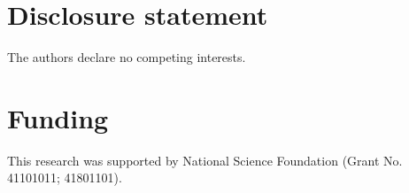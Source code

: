 \documentclass[]{interact}
\theoremstyle{plain}%
\theoremstyle{definition}
\theoremstyle{remark}
\begin{document}
\section*{Disclosure statement}

The authors declare no competing interests. 

\section*{Funding}

This research was supported by National Science Foundation (Grant No. 41101011; 41801101). 






\end{document}
